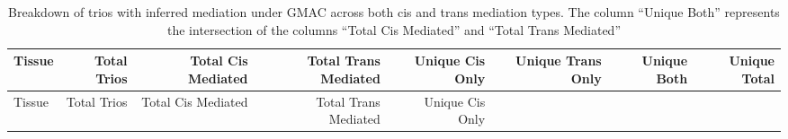 \documentclass[
]{article}
\begin{document}
\begin{longtable}[]{@{}lrrrrrrr@{}}
\caption{Breakdown of trios with inferred mediation under GMAC across
both cis and trans mediation types. The column ``Unique Both''
represents the intersection of the columns ``Total Cis Mediated'' and
``Total Trans Mediated''}\tabularnewline
\toprule
\begin{minipage}[b]{0.09\columnwidth}\raggedright
Tissue\strut
\end{minipage} & \begin{minipage}[b]{0.07\columnwidth}\raggedleft
Total Trios\strut
\end{minipage} & \begin{minipage}[b]{0.12\columnwidth}\raggedleft
Total Cis Mediated\strut
\end{minipage} & \begin{minipage}[b]{0.13\columnwidth}\raggedleft
Total Trans Mediated\strut
\end{minipage} & \begin{minipage}[b]{0.10\columnwidth}\raggedleft
Unique Cis Only\strut
\end{minipage} & \begin{minipage}[b]{0.11\columnwidth}\raggedleft
Unique Trans Only\strut
\end{minipage} & \begin{minipage}[b]{0.07\columnwidth}\raggedleft
Unique Both\strut
\end{minipage} & \begin{minipage}[b]{0.08\columnwidth}\raggedleft
Unique Total\strut
\end{minipage}\tabularnewline
\midrule
\endfirsthead
\toprule
\begin{minipage}[b]{0.09\columnwidth}\raggedright
Tissue\strut
\end{minipage} & \begin{minipage}[b]{0.07\columnwidth}\raggedleft
Total Trios\strut
\end{minipage} & \begin{minipage}[b]{0.12\columnwidth}\raggedleft
Total Cis Mediated\strut
\end{minipage} & \begin{minipage}[b]{0.13\columnwidth}\raggedleft
Total Trans Mediated\strut
\end{minipage} & \begin{minipage}[b]{0.10\columnwidth}\raggedleft
Unique Cis Only\strut
\end{minipage} & \begin{minipage}[b]{0.11\columnwidth}\raggedleft

\end{minipage}
\end{longtable}
\end{document}
